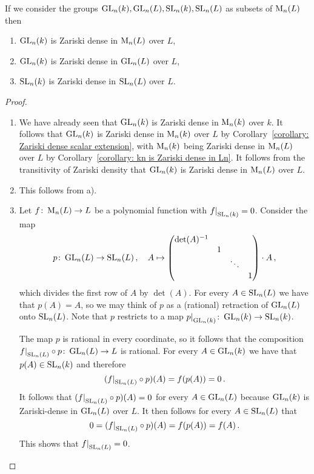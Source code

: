\begin{proposition}
  \leavevmode
  If we consider the groups $\operatorname{GL}_n(k), \operatorname{GL}_n(L), \operatorname{SL}_n(k), \operatorname{SL}_n(L)$ as subsets of $\operatorname{M}_n(L)$ then
  \begin{enumerate}
    \item
      $\operatorname{GL}_n(k)$ is Zariski dense in $\operatorname{M}_n(L)$ over $L$,
    \item
      $\operatorname{GL}_n(k)$ is Zariski dense in $\operatorname{GL}_n(L)$ over $L$,
    \item
      $\operatorname{SL}_n(k)$ is Zariski dense in $\operatorname{SL}_n(L)$ over $L$.
  \end{enumerate}
\end{proposition}
\begin{proof}
  \leavevmode
  \begin{enumerate}
    \item
      We have already seen that $\operatorname{GL}_n(k)$ is Zariski dense in $\operatorname{M}_n(k)$ over $k$.
      It follows that $\operatorname{GL}_n(k)$ is Zariski dense in $\operatorname{M}_n(k)$ over $L$ by Corollary~\ref{corollary: Zariski dense scalar extension}, with $\operatorname{M}_n(k)$ being Zariski dense in $\operatorname{M}_n(L)$ over $L$ by Corollary~\ref{corollary: kn is Zariski dense in Ln}.
      It follows from the transitivity of Zariski density that $\operatorname{GL}_n(k)$ is Zariski dense in $\operatorname{M}_n(L)$ over $L$.
    \item
      This follows from a).
    \item
      Let $f \colon \operatorname{M}_n(L) \to L$ be a polynomial function with $\restrict{f}{\SL_n(k)} = 0$.
      Consider the map
      \[
                p
        \colon  \operatorname{GL}_n(L)
        \to     \operatorname{SL}_n(L) \,,
        \quad   A
        \mapsto \begin{pmatrix}
                  \det(A)^{-1}  &   &         &     \\
                                & 1 &         &     \\
                                &   & \ddots  &     \\
                                &   &         & 1
                \end{pmatrix}
                \cdot
                A \,,
      \]
      which divides the first row of $A$ by $\det(A)$.
      For every $A \in \operatorname{SL}_n(L)$ we have that $p(A) = A$, so we may think of $p$ as a (rational) retraction of $\operatorname{GL}_n(L)$ onto $\operatorname{SL}_n(L)$.
      Note that $p$ restricts to a map $\restrict{p}{\GL_n(k)} \colon \GL_n(k) \to \SL_n(k)$.
      
      The map $p$ is rational in every coordinate, so it follows that the composition $\restrict{f}{\SL_n(L)} \circ p \colon \GL_n(L) \to L$ is rational.
      For every $A \in \operatorname{GL}_n(k)$ we have that $p(A) \in \operatorname{SL}_n(k)$ and therefore
      \[
          (\restrict{f}{\SL_n(L)} \circ p)(A)
        = f(p(A))
        = 0 \,.
      \]
      It follows that $(\restrict{f}{\SL_n(L)} \circ p)(A) = 0$ for every $A \in \operatorname{GL}_n(L)$ because $\operatorname{GL}_n(k)$ is Zariski-dense in $\operatorname{GL}_n(L)$ over $L$.
      It then follows for every $A \in \operatorname{SL}_n(L)$ that
      \[
          0
        = (\restrict{f}{\SL_n(L)} \circ p)(A)
        = f(p(A))
        = f(A) \,.
      \]
      This shows that $\restrict{f}{\SL_n(L)} = 0$.
    \qedhere
  \end{enumerate}
\end{proof}


